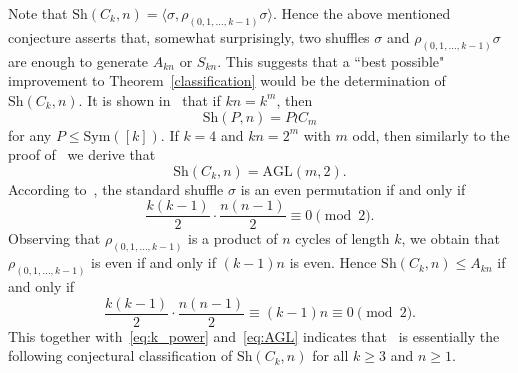 \documentclass[11pt,a4paper,reqno]{amsart}
\newcommand{\A}{A}
\newcommand{\AGL}{\mathrm{AGL}}
\newcommand{\Sym}{\mathrm{Sym}}
\newcommand{\Sh}{\mathrm{Sh}}
\theoremstyle{definition}
\newtheorem{conjecture}[theorem]{Conjecture}
\begin{document}
Note that $\Sh(C_k,n)=\langle \sigma, \rho_{(0,1,\ldots,k-1)}\sigma\rangle$. Hence the above mentioned conjecture asserts that, somewhat surprisingly, two shuffles $\sigma$ and $\rho_{(0,1,\ldots,k-1)}\sigma$ are enough to generate $\A_{kn}$ or $S_{kn}$. This suggests that a ``best possible" improvement to Theorem~\ref{classification} would be the determination of $\Sh(C_k,n)$. It is shown in~\cite[Theorem~1.4(1)]{AMP2021} that if $kn=k^m$, then
\begin{equation}\label{eq:k_power}
  \Sh(P,n)=P\wr C_m
\end{equation}
for any $P\leq \Sym([k])$. If $k=4$ and $kn=2^m$ with $m$ odd, then similarly to the proof of~\cite[Theorem~2.6]{CHMW2005} we derive that
\begin{equation}\label{eq:AGL}
  \Sh(C_k,n)=\AGL(m,2).
\end{equation}
According to~\cite[Lemma~2]{MM1987}, the standard shuffle $\sigma$ is an even permutation if and only if
\begin{equation}\label{eq:parity_sigma}
  \frac{k(k-1)}{2}\cdot\frac{n(n-1)}{2}\equiv 0\pmod{2}.
\end{equation}
Observing that $\rho_{(0,1,\ldots,k-1)}$ is a product of $n$ cycles of length $k$, we obtain that $\rho_{(0,1,\ldots,k-1)}$ is even if and only if $(k-1)n$ is even. Hence $\Sh(C_k,n)\leq \A_{kn}$ if and only if
\[
  \frac{k(k-1)}{2}\cdot\frac{n(n-1)}{2}\equiv (k-1)n\equiv 0\pmod{2}.
\]
This together with~\eqref{eq:k_power} and~\eqref{eq:AGL} indicates that~\cite[Conjecture~1.10]{AMP2021} is essentially the following conjectural classification of $\Sh(C_k,n)$ for all $k\geq 3$ and $n\geq 1$.

\end{document}
